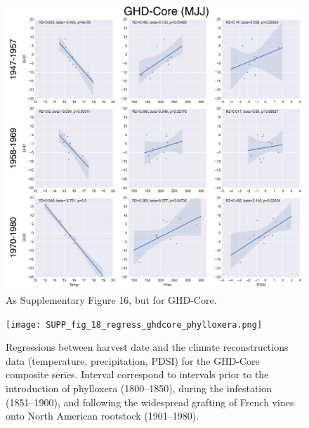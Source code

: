 \documentclass[12pt]{article}
\begin{document}
\begin{figure}
\center
\includegraphics[width=1.0\columnwidth,scale=2]{SUPP_fig_17_clonetest_GHDcore.png}
\caption{As Supplementary Figure 16, but for GHD-Core.}
\end{figure}

\begin{figure}
\center
\texttt{[image: SUPP\_fig\_18\_regress\_ghdcore\_phylloxera.png]}
\caption{Regressions between harvest date and the climate reconstructions data (temperature, precipitation, PDSI) for the GHD-Core composite series. Interval correspond to intervals prior to the introduction of phylloxera (1800--1850), during the infestation (1851--1900), and following the widespread grafting of French vines onto North American rootstock (1901--1980).}
\end{figure}
\end{document}
